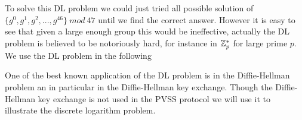 \noindent
To solve this DL problem we could just tried all possible solution of \\
$ \{g^0, g^1, g^2,...,g^{46}\} \ mod \ 47$ until we find the correct answer. However it is easy to see that given a large enough group this would be ineffective, actually the DL problem is believed to be notoriously hard, for instance in $\mathbb{Z}_p^*$ for large prime $p$. \\

\noindent
We use the DL problem in the following

\iffalse
    \begin{defi}[Computational Diffie-Hellman (CDH) problem]
    \begin{math}g\in\Z_p, \ g\neq1 \end{math}\\
    Given \begin{math}(g,g^a,g^b)\end{math} find(compute)  \begin{math}(g^{a*b})\end{math} is hard problem.\\
    Definition: Need a reference?? \\
    \textcolor{red}{Kasper}
    \end{defi}
\fi

One of the best known application of the DL problem is in the Diffie-Hellman problem an in particular in the Diffie-Hellman key exchange. Though the Diffie-Hellman key exchange is not used in the PVSS protocol we will use it to illustrate the discrete logarithm problem.



